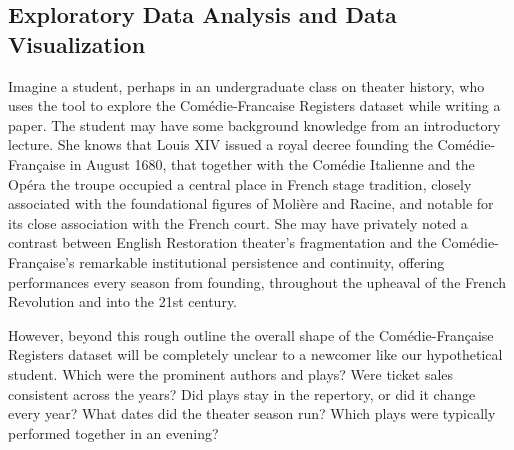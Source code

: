 \documentclass[	DIV=calc,%
							paper=a4,%
							fontsize=11pt,%
							twocolumn]{scrartcl}	 					%
\begin{document}
\subsection*{Exploratory Data Analysis and Data Visualization}

Imagine a student, perhaps in an undergraduate class on theater history, who uses the tool to explore the Comédie-Francaise Registers dataset while writing a paper. The student may have some background knowledge from an introductory lecture.  She knows that Louis XIV issued a royal decree founding the Comédie-Française in August 1680, that together with the Comédie Italienne and the Opéra the troupe occupied a central place in French stage tradition, closely associated with the foundational figures of Molière and Racine, and notable for its close association with the French court.  She may have privately noted a contrast between English Restoration theater’s fragmentation and the Comédie-Française’s remarkable institutional persistence and continuity, offering performances every season from founding, throughout the upheaval of the French Revolution and into the 21st century.

However, beyond this rough outline the overall shape of the Comédie-Française Registers dataset will be completely unclear to a newcomer like our hypothetical student.  Which were the prominent authors and plays? Were ticket sales consistent across the years?  Did plays stay in the repertory, or did it change every year?  What dates did the theater season run?  Which plays were typically performed together in an evening?
\end{document}
